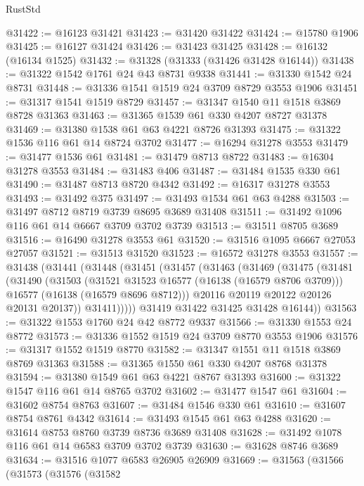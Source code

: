 \begin{lexlean}{RustStd}
\begin{coremodule}
@31422 := @16123 @31421
@31423 := @31420 @31422
@31424 := @15780 @1906
@31425 := @16127 @31424
@31426 := @31423 @31425
@31428 := @16132 (@16134 @1525)
@31432 := @31328 (@31333 (@31426 @31428 @16144))
@31438 := @31322 @1542 @1761 @24 @43 @8731 @9338
@31441 := @31330 @1542 @24 @8731
@31448 := @31336 @1541 @1519 @24 @3709 @8729 @3553 @1906
@31451 := @31317 @1541 @1519 @8729
@31457 := @31347 @1540 @11 @1518 @3869 @8728 @31363
@31463 := @31365 @1539 @61 @330 @4207 @8727 @31378
@31469 := @31380 @1538 @61 @63 @4221 @8726 @31393
@31475 := @31322 @1536 @116 @61 @14 @8724 @3702
@31477 := @16294 @31278 @3553
@31479 := @31477 @1536 @61
@31481 := @31479 @8713 @8722
@31483 := @16304 @31278 @3553
@31484 := @31483 @406
@31487 := @31484 @1535 @330 @61
@31490 := @31487 @8713 @8720 @4342
@31492 := @16317 @31278 @3553
@31493 := @31492 @375
@31497 := @31493 @1534 @61 @63 @4288
@31503 := @31497 @8712 @8719 @3739 @8695 @3689 @31408
@31511 := @31492 @1096 @116 @61 @14 @6667 @3709 @3702 @3739
@31513 := @31511 @8705 @3689
@31516 := @16490 @31278 @3553 @61
@31520 := @31516 @1095 @6667 @27053 @27057
@31521 := @31513 @31520
@31523 := @16572 @31278 @3553
@31557 := @31438
    (@31441
      (@31448
        (@31451
          (@31457
            (@31463
              (@31469
                (@31475
                  (@31481
                    (@31490
                      (@31503
                        (@31521 @31523 @16577 (@16138 (@16579 @8706 @3709)))
                        @16577
                        (@16138 (@16579 @8696 @8712)))
                      @20116
                      @20119
                      @20122
                      @20126
                      @20131
                      @20137))
                  @31411)))))
        @31419
        @31422
        @31425
        @31428
        @16144))
@31563 := @31322 @1553 @1760 @24 @42 @8772 @9337
@31566 := @31330 @1553 @24 @8772
@31573 := @31336 @1552 @1519 @24 @3709 @8770 @3553 @1906
@31576 := @31317 @1552 @1519 @8770
@31582 := @31347 @1551 @11 @1518 @3869 @8769 @31363
@31588 := @31365 @1550 @61 @330 @4207 @8768 @31378
@31594 := @31380 @1549 @61 @63 @4221 @8767 @31393
@31600 := @31322 @1547 @116 @61 @14 @8765 @3702
@31602 := @31477 @1547 @61
@31604 := @31602 @8754 @8763
@31607 := @31484 @1546 @330 @61
@31610 := @31607 @8754 @8761 @4342
@31614 := @31493 @1545 @61 @63 @4288
@31620 := @31614 @8753 @8760 @3739 @8736 @3689 @31408
@31628 := @31492 @1078 @116 @61 @14 @6583 @3709 @3702 @3739
@31630 := @31628 @8746 @3689
@31634 := @31516 @1077 @6583 @26905 @26909
@31669 := @31563
    (@31566
      (@31573
        (@31576
          (@31582

\end{coremodule}
\end{lexlean}
